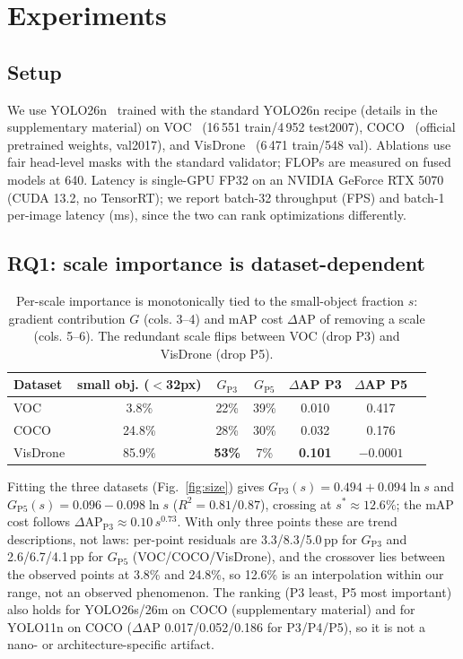 \documentclass[3p]{elsarticle}
\begin{document}
\section{Experiments}\label{sec:exp}
\subsection{Setup}
We use YOLO26n~\cite{jocher2026ultralyticsyolo26unifiedrealtime} trained with the standard YOLO26n recipe (details in the supplementary material) on VOC~\cite{everingham2010voc} (16\,551 train/4\,952 test2007), COCO~\cite{lin2014coco} (official pretrained weights, val2017), and VisDrone~\cite{zhu2022visdrone} (6\,471 train/548 val). Ablations use fair head-level masks with the standard validator; FLOPs are measured on fused models at 640. Latency is single-GPU FP32 on an NVIDIA GeForce RTX 5070 (CUDA 13.2, no TensorRT); we report batch-32 throughput (FPS) and batch-1 per-image latency (ms), since the two can rank optimizations differently.

\subsection{RQ1: scale importance is dataset-dependent}
\begin{table}[h]\centering\footnotesize
\begin{tabular}{lcccccc}
\toprule
Dataset & small obj. ($<$32px) & $G_{\mathrm{P3}}$ & $G_{\mathrm{P5}}$ & $\Delta$AP P3 & $\Delta$AP P5\\
\midrule
VOC & 3.8\% & 22\% & 39\% & 0.010 & 0.417\\
COCO & 24.8\% & 28\% & 30\% & 0.032 & 0.176\\
VisDrone & 85.9\% & \textbf{53\%} & 7\% & \textbf{0.101} & $-0.0001$\\
\bottomrule
\end{tabular}
\caption{Per-scale importance is monotonically tied to the small-object fraction $s$: gradient contribution $G$ (cols. 3--4) and mAP cost $\Delta$AP of removing a scale (cols. 5--6). The redundant scale flips between VOC (drop P3) and VisDrone (drop P5).}
\label{tab:scales}
\end{table}
Fitting the three datasets (Fig.~\ref{fig:size}) gives $G_{\mathrm{P3}}(s)=0.494+0.094\ln s$ and $G_{\mathrm{P5}}(s)=0.096-0.098\ln s$ ($R^2=0.81/0.87$), crossing at $s^*\approx12.6\%$; the mAP cost follows $\Delta\text{AP}_{\mathrm{P3}}\approx0.10\,s^{0.73}$. With only three points these are trend descriptions, not laws: per-point residuals are 3.3/8.3/5.0\,pp for $G_{\mathrm{P3}}$ and 2.6/6.7/4.1\,pp for $G_{\mathrm{P5}}$ (VOC/COCO/VisDrone), and the crossover lies between the observed points at 3.8\% and 24.8\%, so 12.6\% is an interpolation within our range, not an observed phenomenon. The ranking (P3 least, P5 most important) also holds for YOLO26s/26m on COCO (supplementary material) and for YOLO11n on COCO ($\Delta$AP 0.017/0.052/0.186 for P3/P4/P5), so it is not a nano- or architecture-specific artifact.
\end{document}
